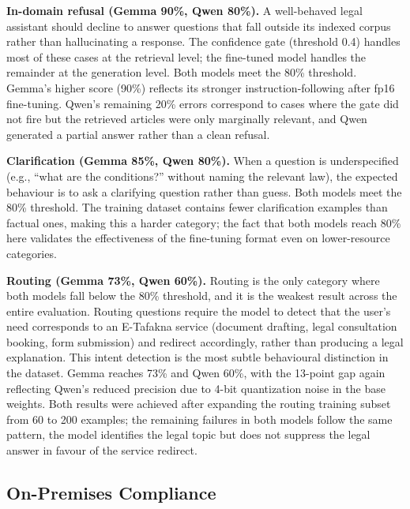 \vspace{1em}

\textbf{In-domain refusal (Gemma 90\%, Qwen 80\%).} A well-behaved legal assistant should decline to answer questions that fall outside its indexed corpus rather than hallucinating a response. The confidence gate (threshold 0.4) handles most of these cases at the retrieval level; the fine-tuned model handles the remainder at the generation level. Both models meet the 80\% threshold. Gemma's higher score (90\%) reflects its stronger instruction-following after fp16 fine-tuning. Qwen's remaining 20\% errors correspond to cases where the gate did not fire but the retrieved articles were only marginally relevant, and Qwen generated a partial answer rather than a clean refusal.

\vspace{1em}

\textbf{Clarification (Gemma 85\%, Qwen 80\%).} When a question is underspecified (e.g., ``what are the conditions?'' without naming the relevant law), the expected behaviour is to ask a clarifying question rather than guess. Both models meet the 80\% threshold. The training dataset contains fewer clarification examples than factual ones, making this a harder category; the fact that both models reach 80\% here validates the effectiveness of the fine-tuning format even on lower-resource categories.

\vspace{1em}

\textbf{Routing (Gemma 73\%, Qwen 60\%).} Routing is the only category where both models fall below the 80\% threshold, and it is the weakest result across the entire evaluation. Routing questions require the model to detect that the user's need corresponds to an E-Tafakna service (document drafting, legal consultation booking, form submission) and redirect accordingly, rather than producing a legal explanation. This intent detection is the most subtle behavioural distinction in the dataset. Gemma reaches 73\% and Qwen 60\%, with the 13-point gap again reflecting Qwen's reduced precision due to 4-bit quantization noise in the base weights. Both results were achieved after expanding the routing training subset from 60 to 200 examples; the remaining failures in both models follow the same pattern, the model identifies the legal topic but does not suppress the legal answer in favour of the service redirect.

\subsection{On-Premises Compliance}
\label{subsec:ch4-onpremises}


